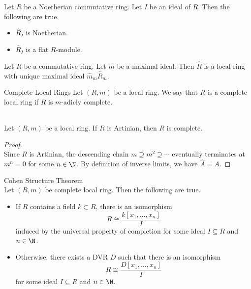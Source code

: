 \documentclass[a4paper]{article}
\begin{document}
\begin{prp}{}{} Let $R$ be a Noetherian commutative ring. Let $I$ be an ideal of $R$. Then the following are true. 
\begin{itemize}
\item $\widehat{R}_I$ is Noetherian. 
\item $\widehat{R}_I$ is a flat $R$-module. 
\end{itemize}
\end{prp}

\begin{prp}{}{} Let $R$ be a commutative ring. Let $m$ be a maximal ideal. Then $\widehat{R}$ is a local ring with unique maximal ideal $\widehat{m}_m\widehat{R}_m$. 
\end{prp}

\begin{defn}{Complete Local Rings}{} Let $(R,m)$ be a local ring. We say that $R$ is a complete local ring if $R$ is $m$-adicly complete. 
\end{defn}

\begin{lmm}{}{}\\
Let $(R,m)$ be a local ring. If $R$ is Artinian, then $R$ is complete. 
\begin{proof}\\
Since $R$ is Artinian, the descending chain $m\supseteq m^2\supseteq\cdots$ eventually terminates at $m^n=0$ for some $n\in\N$. By definition of inverse limits, we have $\widehat{A}=A$. 
\end{proof}
\end{lmm}

\begin{thm}{Cohen Structure Theorem}{}\\
Let $(R,m)$ be complete local ring. Then the following are true. 
\begin{itemize}
\item If $R$ contains a field $k\subset R$, there is an isomorphism $$R\cong\frac{k[x_1,\dots,x_n]}{I}$$ induced by the universal property of completion for some ideal $I\subseteq R$ and $n\in\N$. 
\item Otherwise, there exists a DVR $D$ such that there is an isomorphism $$R\cong\frac{D[x_1,\dots,x_n]}{I}$$ for some ideal $I\subseteq R$ and $n\in\N$. 
\end{itemize}
\end{thm}
\end{document}
